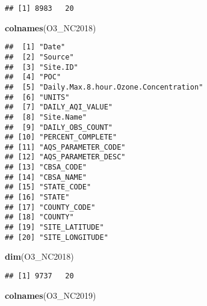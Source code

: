 \documentclass[
]{article}
\newenvironment{Shaded}{\begin{snugshade}}{\end{snugshade}}
\newcommand{\KeywordTok}[1]{\textcolor[rgb]{0.13,0.29,0.53}{\textbf{#1}}}
\newcommand{\NormalTok}[1]{#1}
\begin{document}
\begin{verbatim}
## [1] 8983   20
\end{verbatim}

\begin{Shaded}
\begin{Highlighting}[]
\KeywordTok{colnames}\NormalTok{(O3_NC2018)}
\end{Highlighting}
\end{Shaded}

\begin{verbatim}
##  [1] "Date"                                
##  [2] "Source"                              
##  [3] "Site.ID"                             
##  [4] "POC"                                 
##  [5] "Daily.Max.8.hour.Ozone.Concentration"
##  [6] "UNITS"                               
##  [7] "DAILY_AQI_VALUE"                     
##  [8] "Site.Name"                           
##  [9] "DAILY_OBS_COUNT"                     
## [10] "PERCENT_COMPLETE"                    
## [11] "AQS_PARAMETER_CODE"                  
## [12] "AQS_PARAMETER_DESC"                  
## [13] "CBSA_CODE"                           
## [14] "CBSA_NAME"                           
## [15] "STATE_CODE"                          
## [16] "STATE"                               
## [17] "COUNTY_CODE"                         
## [18] "COUNTY"                              
## [19] "SITE_LATITUDE"                       
## [20] "SITE_LONGITUDE"
\end{verbatim}

\begin{Shaded}
\begin{Highlighting}[]
\KeywordTok{dim}\NormalTok{(O3_NC2018)}
\end{Highlighting}
\end{Shaded}

\begin{verbatim}
## [1] 9737   20
\end{verbatim}

\begin{Shaded}
\begin{Highlighting}[]
\KeywordTok{colnames}\NormalTok{(O3_NC2019)}
\end{Highlighting}
\end{Shaded}
\end{document}
